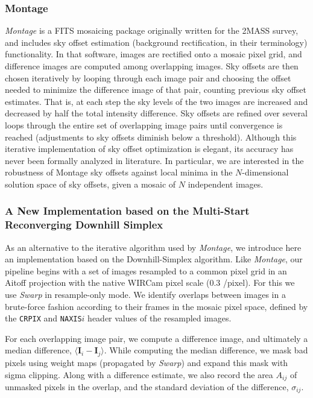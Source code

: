 \documentclass[iop]{emulateapj}
\newcommand{\vect}[1]{\boldsymbol{#1}} %
\newcommand{\sw}[1]{\textit{#1}} %
\begin{document}
\subsubsection{Montage}
\label{sec:montage_algo}

\sw{Montage} is a FITS mosaicing package \citep{Berriman:2008} originally written for the 2MASS survey, and includes sky offset estimation (background rectification, in their terminology) functionality.
In that software, images are rectified onto a mosaic pixel grid, and difference images are computed among overlapping images.
Sky offsets are then chosen iteratively by looping through each image pair and choosing the offset needed to minimize the difference image of that pair, counting previous sky offset estimates.
That is, at each step the sky levels of the two images are increased and decreased by half the total intensity difference.
Sky offsets are refined over several loops through the entire set of overlapping image pairs until convergence is reached (adjustments to sky offsets diminish below a threshold).
Although this iterative implementation of sky offset optimization is elegant, its accuracy has never been formally analyzed in literature.
In particular, we are interested in the robustness of Montage sky offsets against local minima in the $N$-dimensional solution space of sky offsets, given a mosaic of $N$ independent images.

\subsubsection{A New Implementation based on the Multi-Start Reconverging Downhill Simplex}
\label{sec:msrnm_algo}

As an alternative to the iterative algorithm used by \sw{Montage}, we introduce here an implementation based on the \cite{Nelder:1965} Downhill-Simplex algorithm.
Like \sw{Montage}, our pipeline begins with a set of images resampled to a common pixel grid in an Aitoff projection with the native WIRCam pixel scale (0.3 \arcsec/pixel).
For this we use \sw{Swarp} \citep{Bertin:2002} in resample-only mode.
We identify overlaps between images in a brute-force fashion according to their frames in the mosaic pixel space, defined by the \texttt{CRPIX} and \texttt{NAXIS}$i$ header values of the resampled images.

For each overlapping image pair, we compute a difference image, and ultimately a median difference, $\langle \vect{I}_i - \vect{I}_j \rangle$.
While computing the median difference, we mask bad pixels using weight maps (propagated by \sw{Swarp}) and expand this mask with sigma clipping.
Along with a difference estimate, we also record the area $A_{ij}$ of unmasked pixels in the overlap, and the standard deviation of the difference, $\sigma_{ij}$.
\end{document}
